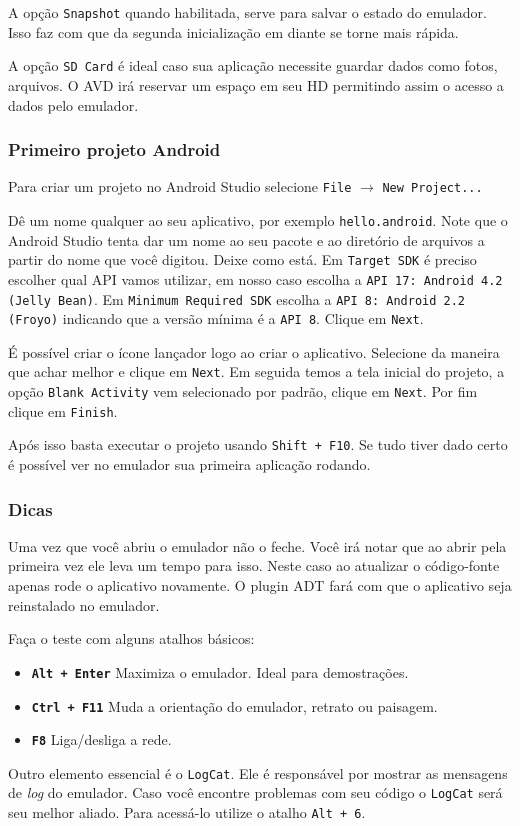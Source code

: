 A opção \texttt{Snapshot} quando habilitada, serve para salvar o estado
do emulador. Isso faz com que da segunda inicialização em diante se
torne mais rápida.

A opção \texttt{SD Card} é ideal caso sua aplicação necessite guardar
dados como fotos, arquivos. O AVD irá reservar um espaço em seu HD
permitindo assim o acesso a dados pelo emulador.

\subsubsection{Primeiro projeto Android \label{sssec:testando}}

Para criar um projeto no Android Studio selecione \texttt{File}
$\rightarrow$ \texttt{New Project...}

Dê um nome qualquer ao seu aplicativo, por exemplo
\texttt{hello.android}. Note que o Android Studio tenta dar um nome ao
seu pacote e ao diretório de arquivos a partir do nome que você digitou.
Deixe como está. Em \texttt{Target SDK} é preciso escolher qual API
vamos utilizar, em nosso caso escolha a
\texttt{API 17: Android 4.2 (Jelly Bean)}. Em
\texttt{Minimum Required SDK} escolha a
\texttt{API 8: Android 2.2 (Froyo)} indicando que a versão mínima é a
\texttt{API 8}. Clique em \texttt{Next}.

É possível criar o ícone lançador logo ao criar o aplicativo. Selecione
da maneira que achar melhor e clique em \texttt{Next}. Em seguida temos
a tela inicial do projeto, a opção \texttt{Blank Activity} vem
selecionado por padrão, clique em \texttt{Next}. Por fim clique em
\texttt{Finish}.

Após isso basta executar o projeto usando \texttt{Shift + F10}. Se tudo
tiver dado certo é possível ver no emulador sua primeira aplicação
rodando.

\subsubsection{Dicas}

Uma vez que você abriu o emulador não o feche. Você irá notar que ao
abrir pela primeira vez ele leva um tempo para isso. Neste caso ao
atualizar o código-fonte apenas rode o aplicativo novamente. O plugin
ADT fará com que o aplicativo seja reinstalado no emulador.

Faça o teste com alguns atalhos básicos:

\begin{itemize}
\item
  \textbf{\texttt{Alt + Enter}} Maximiza o emulador. Ideal para
  demostrações.
\item
  \textbf{\texttt{Ctrl + F11}} Muda a orientação do emulador, retrato ou
  paisagem.
\item
  \textbf{\texttt{F8}} Liga/desliga a rede.
\end{itemize}
Outro elemento essencial é o \texttt{LogCat}. Ele é responsável por
mostrar as mensagens de \emph{log} do emulador. Caso você encontre
problemas com seu código o \texttt{LogCat} será seu melhor aliado. Para
acessá-lo utilize o atalho \texttt{Alt + 6}.

